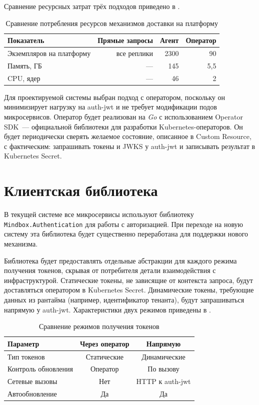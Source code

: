 Сравнение ресурсных затрат трёх подходов приведено в .

\begin{table}[ht!]
  \centering
  \caption{Сравнение потребления ресурсов механизмов доставки на платформу}
  \label{tab:delivery-cost}
  \begin{tabular}{lrrr}
    \hline
    \textbf{Показатель} & \textbf{Прямые запросы} & \textbf{Агент} & \textbf{Оператор} \\
    \hline
    Экземпляров на платформу & все реплики & 2300  & 90 \\
    Память, ГБ               & ---         & 145   & 5{,}5 \\
    CPU, ядер                & ---         & 46    & 2 \\
    \hline
  \end{tabular}
\end{table}

Для проектируемой системы выбран подход с оператором,
поскольку он минимизирует нагрузку на auth-jwt
и не требует модификации подов микросервисов.
Оператор будет реализован на \emph{Go}
с использованием Operator SDK~---
официальной библиотеки для разработки Kubernetes-операторов.
Он будет периодически сверять желаемое состояние,
описанное в Custom Resource, с фактическим:
запрашивать токены и JWKS у auth-jwt
и записывать результат в Kubernetes Secret.

\section{Клиентская библиотека}\label{sec:client-library}

В текущей системе все микросервисы используют библиотеку
\texttt{Mindbox.Authentication} для работы с авторизацией.
При переходе на новую систему эта библиотека будет существенно переработана
для поддержки нового механизма.

Библиотека будет предоставлять отдельные абстракции
для каждого режима получения токенов,
скрывая от потребителя детали взаимодействия с инфраструктурой.
Статические токены, не зависящие от контекста запроса,
будут доставляться оператором в Kubernetes Secret.
Динамические токены, требующие данных из рантайма
(например, идентификатор тенанта),
будут запрашиваться напрямую у auth-jwt.
Характеристики двух режимов приведены в .

\begin{table}[h]
  \centering
  \caption{Сравнение режимов получения токенов}
  \label{tab:token-modes}
  \begin{tabularx}{\textwidth}{X c c}
    \hline
    \textbf{Параметр} & \textbf{Через оператор} & \textbf{Напрямую} \\
    \hline
    Тип токенов          & Статические    & Динамические \\
    Контроль обновления  & Оператор       & По вызову \\
    Сетевые вызовы       & Нет            & HTTP к auth-jwt \\
    Автообновление       & Да             & Да \\
    \hline
  \end{tabularx}
\end{table}

